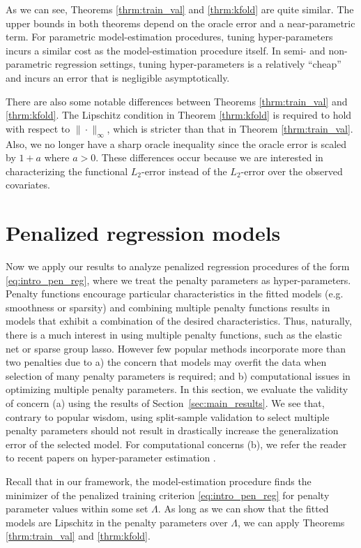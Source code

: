 \documentclass[12pt]{article} %
\theoremstyle{definition}
\begin{document}
As we can see, Theorems \ref{thrm:train_val} and \ref{thrm:kfold} are quite similar. The upper bounds in both theorems depend on the oracle error and a near-parametric term. For parametric model-estimation procedures, tuning hyper-parameters incurs a similar cost as the model-estimation procedure itself. In semi- and non-parametric regression settings, tuning hyper-parameters is a relatively ``cheap'' and incurs an error that is negligible asymptotically.

There are also some notable differences between Theorems \ref{thrm:train_val} and \ref{thrm:kfold}. The Lipschitz condition in Theorem \ref{thrm:kfold} is required to hold with respect to $\| \cdot \|_\infty$, which is stricter than that in Theorem \ref{thrm:train_val}. Also, we no longer have a sharp oracle inequality since the oracle error is scaled by $1+a$ where $a > 0$. These differences occur because we are interested in characterizing the functional $L_2$-error instead of the $L_2$-error over the observed covariates.

\section{Penalized regression models}
\label{sec:examples}
Now we apply our results to analyze penalized regression procedures of the form \eqref{eq:intro_pen_reg}, where we treat the penalty parameters as hyper-parameters.
Penalty functions encourage particular characteristics in the fitted models (e.g. smoothness or sparsity) and combining multiple penalty functions results in models that exhibit a combination of the desired characteristics. 
Thus, naturally, there is a much interest in using multiple penalty functions, such as the elastic net or sparse group lasso.
However few popular methods incorporate more than two penalties due to a) the concern that models may overfit the data when selection of many penalty parameters is required; and b) computational issues in optimizing multiple penalty parameters. In this section, we evaluate the validity of concern (a) using the results of Section~\ref{sec:main_results}. We see that, contrary to popular wisdom, using split-sample validation to select multiple penalty parameters should not result in drastically increase the generalization error of the selected model. For computational concerns (b), we refer the reader to recent papers on hyper-parameter estimation \citep{bengio2000gradient, foo2008efficient, snoek2012practical}.

Recall that in our framework, the model-estimation procedure finds the minimizer of the penalized training criterion \eqref{eq:intro_pen_reg} for penalty parameter values within some set $\Lambda$. As long as we can show that the fitted models are Lipschitz in the penalty parameters over $\Lambda$, we can apply Theorems \ref{thrm:train_val} and \ref{thrm:kfold}.
\end{document}

